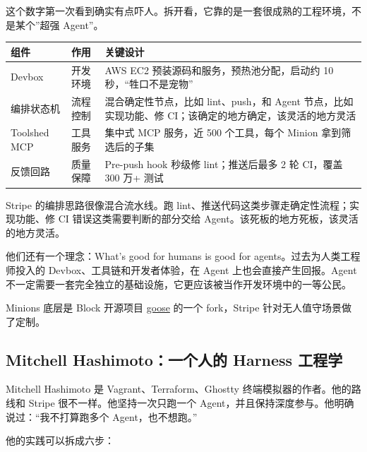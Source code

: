 \documentclass[9pt,a4paper,twocolumn]{ctexart}
\begin{document}
这个数字第一次看到确实有点吓人。拆开看，它靠的是一套很成熟的工程环境，不是某个”超强 Agent”。


{\footnotesize
\begin{tabular}{|p{}|p{}|p{}|}
\hline
\textbf{组件} & \textbf{作用} & \textbf{关键设计} \\
\hline
Devbox & 开发环境 & AWS EC2 预装源码和服务，预热池分配，启动约 10 秒，“牲口不是宠物” \\
\hline
编排状态机 & 流程控制 & 混合确定性节点，比如 lint、push，和 Agent 节点，比如实现功能、修 CI；该确定的地方确定，该灵活的地方灵活 \\
\hline
Toolshed MCP & 工具服务 & 集中式 MCP 服务，近 500 个工具，每个 Minion 拿到筛选后的子集 \\
\hline
反馈回路 & 质量保障 & Pre-push hook 秒级修 lint；推送后最多 2 轮 CI，覆盖 300 万+ 测试 \\
\hline
\end{tabular}
}



Stripe 的编排思路很像混合流水线。跑 lint、推送代码这类步骤走确定性流程；实现功能、修 CI 错误这类需要判断的部分交给 Agent。该死板的地方死板，该灵活的地方灵活。



他们还有一个理念：What's good for humans is good for agents。过去为人类工程师投入的 Devbox、工具链和开发者体验，在 Agent 上也会直接产生回报。Agent 不一定需要一套完全独立的基础设施，它更应该被当作开发环境中的一等公民。



Minions 底层是 Block 开源项目 \href{https://github.com/block/goose}{goose} 的一个 fork，Stripe 针对无人值守场景做了定制。



\subsection*{Mitchell Hashimoto：一个人的 Harness 工程学}


Mitchell Hashimoto 是 Vagrant、Terraform、Ghostty 终端模拟器的作者。他的路线和 Stripe 很不一样。他坚持一次只跑一个 Agent，并且保持深度参与。他明确说过：“我不打算跑多个 Agent，也不想跑。”



他的实践可以拆成六步：
\end{document}
